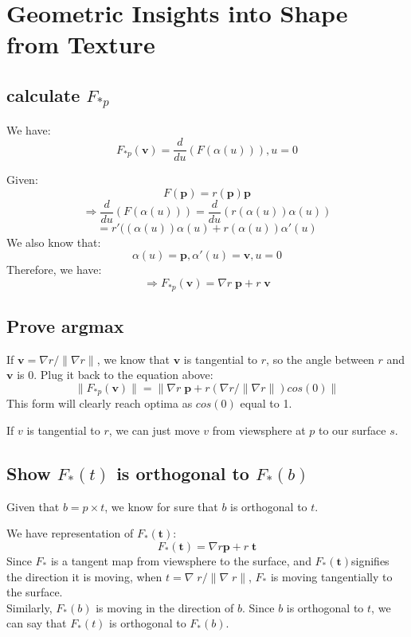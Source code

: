 \documentclass[twoside]{article}
\theoremstyle{definition}
\theoremstyle{definition}
\theoremstyle{remark}
\begin{document}
\section{Geometric Insights into Shape from Texture}
\subsection{calculate $F_{*p}$}
We have:
\[F_{*p} (\pmb{v}) = \frac{d}{du} (F(\alpha(u))), u=0\]

Given:
\[F(\pmb{p}) = r(\pmb{p}) \pmb{p}\]
\[\Rightarrow \frac{d}{du} (F(\alpha(u))) = \frac{d}{du} (r(\alpha(u)) \alpha(u))
\]
\[=r'((\alpha(u))\alpha(u)+r(\alpha(u))\alpha'(u)\]
We also know that:
\[\alpha(u) = \pmb{p}, \alpha'(u) = \pmb{v}, u = 0\]
Therefore, we have:
\[\Rightarrow F_{*p} (\pmb{v}) = \nabla r \;\pmb{ p} + r \;\pmb{v}\]

\subsection{Prove argmax}
If $\pmb{v} = \nabla r / \| \nabla r \|$, we know that $\pmb{v} $ is tangential to $r$, so the angle between $r$ and $\pmb{v} $ is 0. Plug it back to the equation above:
\[\| F_{*p} (\pmb{v}) \| =\| \nabla r \;\pmb{ p} + r ( \nabla r / \| \nabla r \|) cos(0) \|\]
This form will clearly reach optima as $cos(0)$ equal to 1. 

If $v$ is tangential to $r$, we can just move $v$ from viewsphere at $p$ to our surface $s$.  

\subsection{Show $F_*(t)$ is orthogonal to $F_*(b)$}
Given that $b = p \times t$, we know for sure that $b$ is orthogonal to $t$. 

We have representation of $F_* (\pmb{t})$:
\[F_* (\pmb{t}) = \nabla r \pmb{p} + r\;\pmb{t}\]
Since $F_*$ is a tangent map from viewsphere to the surface, and $F_*(\pmb{t})$signifies the direction it is moving, when $t = \nabla \; r / \| \nabla \; r \|$, $F_*$ is moving tangentially to the surface. \\
Similarly, $F_*(b)$ is moving in the direction of $b$. 
Since $b$ is orthogonal to $t$, we can say that $F_*(t)$ is orthogonal to $F_*(b)$.
\end{document}
